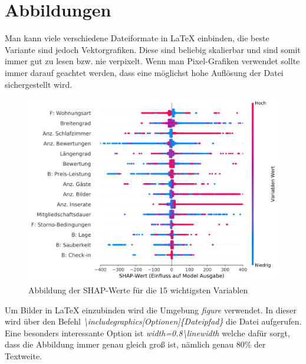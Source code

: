 \chapter{Abbildungen}
Man kann viele verschiedene Dateiformate in LaTeX einbinden, die beste Variante sind jedoch Vektorgrafiken. Diese sind beliebig skalierbar und sind somit immer gut zu lesen bzw. nie verpixelt. Wenn man Pixel-Grafiken verwendet sollte immer darauf geachtet werden, dass eine möglichst hohe Auflösung der Datei sichergestellt wird. 
 \begin{figure}[H]
    \centering
    \includegraphics[width=0.8\linewidth]{graphics/summary.png}
    \caption{Abbildung der SHAP-Werte für die 15 wichtigsten Variablen}
    \label{fig:SHAP}
\end{figure}  
Um Bilder in LaTeX einzubinden wird die Umgebung \emph{figure} verwendet. In dieser wird über den Befehl \emph{\textbackslash includegraphics[Optionen]\{Dateipfad\}} die Datei aufgerufen. Eine besonders interessante Option ist \emph{width=0.8\textbackslash linewidth} welche dafür sorgt, dass die Abbildung immer genau gleich groß ist, nämlich genau 80\% der Textweite. 